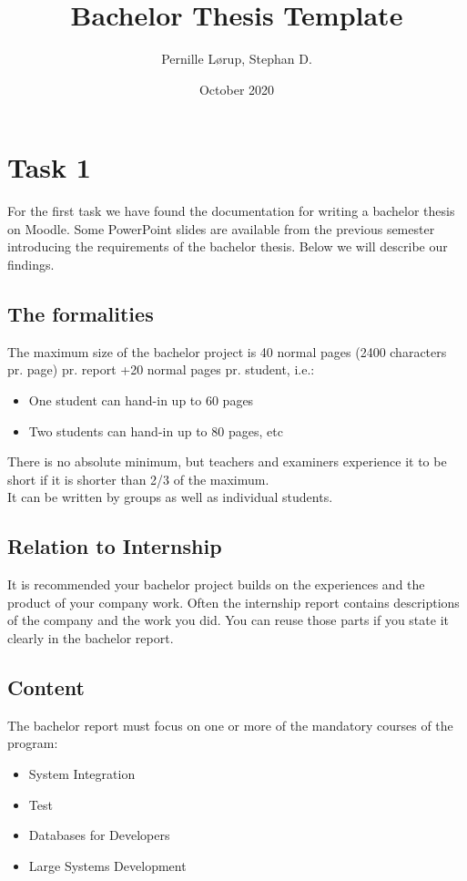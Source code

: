 \documentclass[12pt]{article}
\title{Bachelor Thesis Template}
\author{Pernille Lørup, Stephan D.}
\date{October 2020}
\begin{document}
\clearpage\maketitle
\thispagestyle{empty}

\pagebreak
\tableofcontents

\pagebreak
\section{Task 1}

For the first task we have found the documentation for writing a bachelor thesis on Moodle. Some PowerPoint slides are available from the previous semester introducing the requirements of the bachelor thesis. Below we will describe our findings.

\subsection{The formalities}

The maximum size of the bachelor project is 40 normal pages 
(2400 characters pr. page) pr. report +20 normal pages pr. student, i.e.:

\begin{itemize}
\item One student can hand-in up to 60 pages
\item Two students can hand-in up to 80 pages, etc
\end{itemize}

There is no absolute minimum, but teachers and
examiners experience it to be short if it is shorter
than 2/3 of the maximum.
\\
It can be written by groups as well as individual
students. 

\subsection{Relation to Internship}
It is recommended your bachelor project builds
on the experiences and the product of your
company work.
Often the internship report contains descriptions
of the company and the work you did. You can
reuse those parts if you state it clearly in the
bachelor report. 

\subsection{Content}
The bachelor report must focus on one or more of
the mandatory courses of the program:
\begin{itemize}
\item System Integration
\item Test
\item Databases for Developers
\item Large Systems Development\\
\end{itemize}
\end{document}
